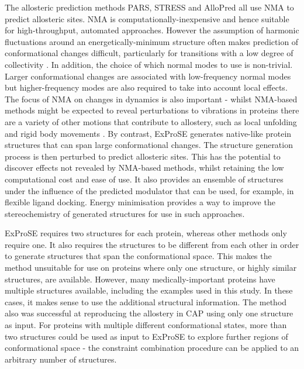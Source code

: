 The allosteric prediction methods PARS, STRESS and AlloPred all use NMA to predict allosteric sites.
NMA is computationally-inexpensive and hence suitable for high-throughput, automated approaches.
However the assumption of harmonic fluctuations around an energetically-minimum structure often makes prediction of conformational changes difficult, particularly for transitions with a low degree of collectivity \cite{Yang2007}.
In addition, the choice of which normal modes to use is non-trivial.
Larger conformational changes are associated with low-frequency normal modes but higher-frequency modes are also required to take into account local effects.
The focus of NMA on changes in dynamics is also important - whilst NMA-based methods might be expected to reveal perturbations to vibrations in proteins there are a variety of other motions that contribute to allostery, such as local unfolding and rigid body movements \cite{Motlagh2014}.
By contrast, ExProSE generates native-like protein structures that can span large conformational changes.
The structure generation process is then perturbed to predict allosteric sites.
This has the potential to discover effects not revealed by NMA-based methods, whilst retaining the low computational cost and ease of use.
It also provides an ensemble of structures under the influence of the predicted modulator that can be used, for example, in flexible ligand docking.
Energy minimisation provides a way to improve the stereochemistry of generated structures for use in such approaches.

ExProSE requires two structures for each protein, whereas other methods only require one.
It also requires the structures to be different from each other in order to generate structures that span the conformational space.
This makes the method unsuitable for use on proteins where only one structure, or highly similar structures, are available.
However, many medically-important proteins have multiple structures available, including the examples used in this study.
In these cases, it makes sense to use the additional structural information.
The method also was successful at reproducing the allostery in CAP using only one structure as input.
For proteins with multiple different conformational states, more than two structures could be used as input to ExProSE to explore further regions of conformational space - the constraint combination procedure can be applied to an arbitrary number of structures.

